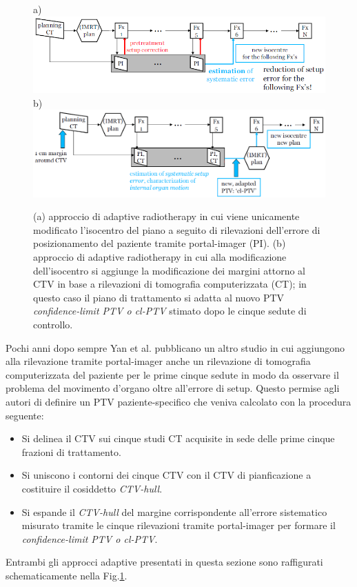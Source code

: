 \begin{figure}[!t]
\centering
a)\includegraphics[width=.95\textwidth]{./cap3/adapt1.png}
b)\includegraphics[width=.95\textwidth]{./cap3/adapt2.png}
\caption{(a) approccio di adaptive radiotherapy in cui viene unicamente modificato l'isocentro del piano a seguito di rilevazioni dell'errore di posizionamento del paziente tramite portal-imager (PI). (b) approccio di adaptive radiotherapy in cui alla modificazione dell'isocentro si aggiunge la modificazione dei margini attorno al CTV in base a rilevazioni di tomografia computerizzata (CT); in questo caso il piano di trattamento si adatta al nuovo PTV \textit{confidence-limit PTV o cl-PTV} stimato dopo le cinque sedute di controllo.}
\label{fig:adaptYAN}
\end{figure}

Pochi anni dopo sempre Yan et al.\cite{Yan2000} pubblicano un altro studio in cui aggiungono alla rilevazione tramite portal-imager anche un rilevazione di tomografia computerizzata del paziente per le prime cinque sedute in modo da osservare il problema del movimento d'organo oltre all'errore di setup. Questo permise agli autori di definire un PTV paziente-specifico che veniva calcolato con la procedura seguente:
\begin{itemize}
\item Si delinea il CTV sui cinque studi CT acquisite in sede delle prime cinque frazioni di trattamento.
\item Si uniscono i contorni dei cinque CTV con il CTV di pianficazione a costituire il cosiddetto \textit{CTV-hull}.
\item Si espande il \textit{CTV-hull} del margine corrispondente all'errore sistematico misurato tramite le cinque rilevazioni tramite portal-imager per formare il \textit{confidence-limit PTV o cl-PTV}. 
\end{itemize}
Entrambi gli approcci adaptive presentati in questa sezione sono raffigurati schematicamente nella Fig.\ref{fig:adaptYAN}.

